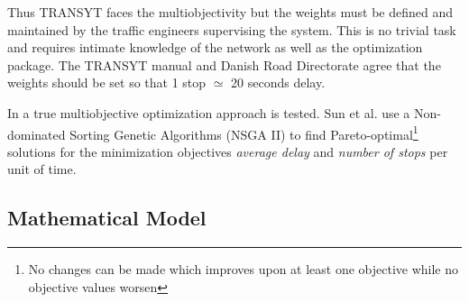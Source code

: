 Thus TRANSYT faces the multiobjectivity but the weights must be defined and maintained by the traffic engineers supervising the system. This is no trivial task and requires intimate knowledge of the network as well as the optimization package. The TRANSYT manual and Danish Road Directorate agree that the weights should be set so that 1 stop $\simeq$ 20 seconds delay.

In \cite{41} a true multiobjective optimization approach is tested. Sun et al. use a Non-dominated Sorting Genetic Algorithms (NSGA II) to find Pareto-optimal\footnote{No changes can be made which improves upon at least one objective while no objective values worsen} solutions for the minimization objectives \textit{average delay} and \textit{number of stops} per unit of time. 

\subsection{Mathematical Model}
